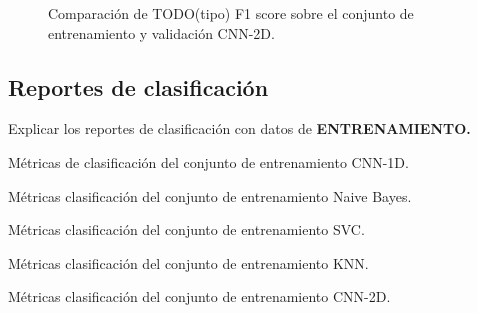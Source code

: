     \begin{figure}[h]
        \centering
        
        \caption{Comparación de TODO(tipo) F1 score sobre el conjunto de entrenamiento y validación CNN-2D.}
        \label{F1Score2DImage}
     \end{figure}


  \subsection{Reportes de clasificación}
       
    Explicar los reportes de clasificación con datos de \textbf{ENTRENAMIENTO.}


    \begin{table}
      \scriptsize
      \begin{subtable}{.2\textwidth}
        \renewcommand{\arraystretch}{1.2}

        \caption{Métricas de clasificación del conjunto de entrenamiento CNN-1D.}
        \label{CNN1DMetrics}
      \end{subtable}
      \hspace{17em}
      \begin{subtable}{.2\textwidth}
        \renewcommand{\arraystretch}{1.2}

        \caption{Métricas clasificación del conjunto de entrenamiento Naive Bayes.}
        \label{NBMetrics}
      \end{subtable}

      \begin{subtable}{.2\textwidth}
        \centering
        \renewcommand{\arraystretch}{1.2}

        \caption{Métricas clasificación del conjunto de entrenamiento SVC.}
        \label{SVCDMetrics}
      \end{subtable}

      \hspace{17em}
      \begin{subtable}{.2\textwidth}
        \renewcommand{\arraystretch}{1.2}

        \caption{Métricas clasificación del conjunto de entrenamiento KNN.}
        \label{KNNMetrics}
      \end{subtable}

      \begin{subtable}{.2\textwidth}
        \centering
        \renewcommand{\arraystretch}{1.2}

        \caption{Métricas clasificación del conjunto de entrenamiento CNN-2D.}
        \label{CNN2DMetrics}
      \end{subtable}
    \end{table}


